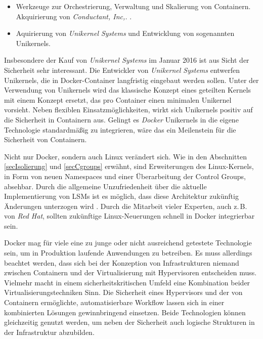 \documentclass[../main.tex]{subfiles}
\begin{document}
\begin{itemize}
    \item Werkzeuge zur Orchestrierung, Verwaltung und Skalierung von Containern. Akquirierung von \emph{Conductant, Inc,.} \cite{dockerAurora}.%
    \item Aquirierung von \emph{Unikernel Systems} und Entwicklung von sogenannten Unikernels. \cite{dockerUnikernel}
  \end{itemize}

  Insbesondere der Kauf von \emph{Unikernel Systems} im Januar 2016 ist aus Sicht der Sicherheit sehr interessant. Die Entwickler von \emph{Unikernel Systems} entwerfen Unikernels, die in Docker-Container langfristig eingebaut werden sollen. Unter der Verwendung von Unikernels wird das klassische Konzept eines geteilten Kernels mit einem Konzept ersetzt, das pro Container einen minimalen Unikernel vorsieht. Neben flexiblen Einsatzmöglichkeiten, wirkt sich Unikernels positiv auf die Sicherheit in Containern aus. Gelingt es \emph{Docker} Unikernels in die eigene Technologie standardmäßig zu integrieren, wäre das ein Meilenstein für die Sicherheit von Containern.

  Nicht nur Docker, sondern auch Linux verändert sich. Wie in den Abschnitten \ref{secIsolierung} und \ref{secCgroups} erwähnt, sind Erweiterungen des Linux-Kernels, in Form von neuen Namespaces und einer Überarbeitung der Control Groups, absehbar. Durch die allgemeine Unzufriedenheit über die aktuelle Implementierung von LSMs ist es möglich, dass diese Architektur zukünftig Änderungen unterzogen wird \cite{seccompLWN}. Durch die Mitarbeit vieler Experten, auch z.\,B. von \emph{Red Hat}, sollten zukünftige Linux-Neuerungen schnell in Docker integrierbar sein.

  Docker mag für viele eine zu junge oder nicht ausreichend getestete Technologie sein, um in Produktion laufende Anwendungen zu betreiben. Es muss allerdings beachtet werden, dass sich bei der Konzeption von Infrastrukturen niemand zwischen Containern und der Virtualisierung mit Hypervisoren entscheiden muss. Vielmehr macht in einem sicherheitskritischen Umfeld eine Kombination beider Virtualisierungstechniken Sinn. Die Sicherheit eines Hypervisors und der von Containern ermöglichte, automatisierbare Workflow lassen sich in einer kombinierten Lösungen gewinnbringend einsetzen. Beide Technologien können gleichzeitig genutzt werden, um neben der Sicherheit auch logische Strukturen in der Infrastruktur abzubilden.
\end{document}
